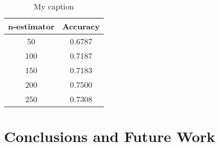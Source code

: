 \documentclass[a4paper]{llncs}
\begin{document}
\begin{table}[!htbp]
\centering
\begin{tabular}{|c|c|}
\hline
n-estimator & Accuracy \\ \hline
50          & 0.6787 \\ \hline
100         & 0.7187 \\ \hline
150         & 0.7183 \\ \hline
200         & 0.7500 \\ \hline
250         & 0.7308 \\ \hline
\end{tabular}
\caption{My caption}
\label{table:GenderAdaBoost}
\end{table}


\section{Conclusions and Future Work}
%





\end{document}

